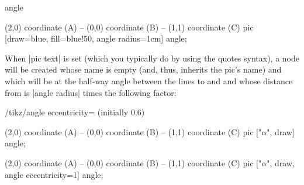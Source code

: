\begin{pictype}{angle}{}
\begin{codeexample}[]
\tikz \draw [line width=2mm]
      (2,0) coordinate (A) -- (0,0) coordinate (B)
   -- (1,1) coordinate (C)
     pic [draw=blue, fill=blue!50, angle radius=1cm] {angle};
\end{codeexample}

  When |pic text| is set (which you typically do by using the quotes
  syntax), a node will be created whose name is empty 
  (and, thus, inherits the pic's name) and which will be at the
  half-way angle between the lines to  and  and whose
  distance from  is |angle radius| times the following factor:
  \begin{key}{/tikz/angle eccentricity= (initially 0.6)}
\begin{codeexample}[]
\tikz \draw (2,0) coordinate (A) -- (0,0) coordinate (B)
         -- (1,1) coordinate (C)
  pic ["$\alpha$", draw] {angle};
\end{codeexample}        
\begin{codeexample}[]
\tikz \draw (2,0) coordinate (A) -- (0,0) coordinate (B)
         -- (1,1) coordinate (C)
  pic ["$\alpha$", draw, angle eccentricity=1] {angle};
\end{codeexample}        
\begin{codeexample}[]
\end{codeexample}        
  \end{key}  
\end{pictype}


